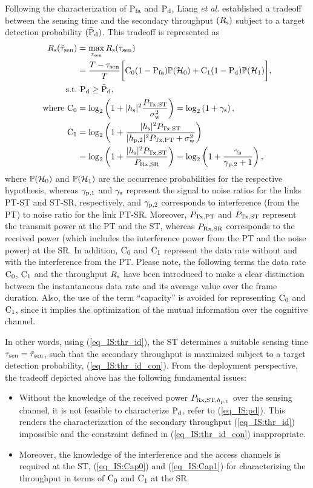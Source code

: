 Following the characterization of $\text{P}_{\text{fa}}$ and $\text{P}_{\text{d}}$, Liang \textit{et al.} \cite{Liang08} established a tradeoff between the sensing time and the secondary throughput $(R_{\text{s}})$ subject to a target detection probability $(\bar{\text{P}}_{\text{d}})$. This tradeoff is represented as
\begin{align}
\trs(\ttsen) &= \maxi_{\tsen} \rs(\tsen) \nonumber \\&= \frac{T- \tsen}{T} \bigg[ \cz (1 - \pfa) \phz +  \co (1 - \pd) \pho  \bigg], \label{eq_IS:thr_id} \\
\text{s.t.} & \text{ } \pd \ge \pdd, \label{eq_IS:thr_id_con} \\ 
\text{where } \cz &= \log_2 \left(1 + |\hs|^2 \frac{\ptranst}{\npo}\right) = \log_2 \left( 1 + \snrso \right) \label{eq_IS:Cap0},\\ 
\co &= \log_2 \left(1 + \frac{|\hs|^2 \ptranst }{|\hpt|^2 \ptranpt  + \npo} \right) \nonumber \\ \quad &= \log_2 \left(1 + \frac{|\hs|^2 \ptranst }{\prcvdsr} \right) = \log_2 \left(1 + \frac{\snrso}{\snrpt + 1}  \right), \label{eq_IS:Cap1} 
\end{align}
where $\mathbb P(\mathcal{H}_0)$ and $\mathbb P(\mathcal{H}_1)$ are the occurrence probabilities for the respective hypothesis, whereas ${\gamma}_{\text{p,1}}$ and ${\gamma}_{\text{s}}$ represent the signal to noise ratios for the links PT-ST and ST-SR, respectively, and ${\gamma}_{\text{p,2}}$ corresponds to interference (from the PT) to noise ratio for the link PT-SR. Moreover, $P_{\text{Tx,PT}}$ and $P_{\text{Tx,ST}}$ represent the transmit power at the PT and the ST, whereas $P_{\text{Rx,SR}}$ corresponds to the received power (which includes the interference power from the PT and the noise power) at the SR. In addition, $\text{C}_{\text{0}}$ and $\text{C}_{\text{1}}$ represent the data rate without and with the interference from the PT. Please note, the following terms the data rate $\text{C}_{\text{0}}$, $\text{C}_{\text{1}}$ and the throughput $R_{\text{s}}$ have been introduced to make a clear distinction between the instantaneous data rate and its average value over the frame duration. Also, the use of the term ``capacity'' is avoided for representing $\text{C}_{\text{0}}$ and $\text{C}_{\text{1}}$, since it implies the optimization of the mutual information over the cognitive channel. 

In other words, using (\ref{eq_IS:thr_id}), the ST determines a suitable sensing time $\tau_{\text{sen}} = \tilde{\tau}_{\text{sen}}$, such that the secondary throughput is maximized subject to a target detection probability,  (\ref{eq_IS:thr_id_con}). From the deployment perspective, the tradeoff depicted above has the following fundamental issues:
\begin{itemize}
\item Without the knowledge of the received power $P_{\text{Rx,ST,$h_{\text{p,1}}$}}$ over the sensing channel, it is not feasible to characterize $\text{P}_{\text{d}}$, refer to (\ref{eq_IS:pd}). This renders the characterization of the secondary throughput (\ref{eq_IS:thr_id}) impossible and the constraint defined in (\ref{eq_IS:thr_id_con}) inappropriate.
\item Moreover, the knowledge of the interference and the access channels is required at the ST,  (\ref{eq_IS:Cap0}) and (\ref{eq_IS:Cap1}) for characterizing the throughput in terms of $\text{C}_{\text{0}}$ and $\text{C}_{\text{1}}$ at the SR.
\end{itemize}

